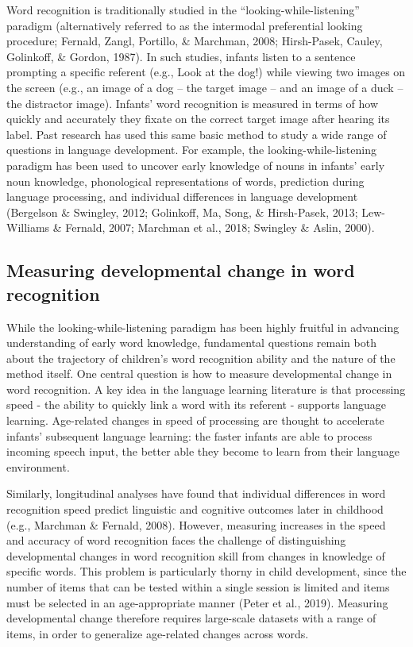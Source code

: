 \documentclass[
  english,
  man,floatsintext]{apa6}
\begin{document}
Word recognition is traditionally studied in the \enquote{looking-while-listening} paradigm (alternatively referred to as the intermodal preferential looking procedure; Fernald, Zangl, Portillo, \& Marchman, 2008; Hirsh-Pasek, Cauley, Golinkoff, \& Gordon, 1987).
In such studies, infants listen to a sentence prompting a specific referent (e.g., Look at the dog!) while viewing two images on the screen (e.g., an image of a dog -- the target image -- and an image of a duck -- the distractor image).
Infants' word recognition is measured in terms of how quickly and accurately they fixate on the correct target image after hearing its label.
Past research has used this same basic method to study a wide range of questions in language development.
For example, the looking-while-listening paradigm has been used to uncover early knowledge of nouns in infants' early noun knowledge, phonological representations of words, prediction during language processing, and individual differences in language development (Bergelson \& Swingley, 2012; Golinkoff, Ma, Song, \& Hirsh-Pasek, 2013; Lew-Williams \& Fernald, 2007; Marchman et al., 2018; Swingley \& Aslin, 2000).

\hypertarget{measuring-developmental-change-in-word-recognition}{%
\subsection{Measuring developmental change in word recognition}\label{measuring-developmental-change-in-word-recognition}}

While the looking-while-listening paradigm has been highly fruitful in advancing understanding of early word knowledge, fundamental questions remain both about the trajectory of children's word recognition ability and the nature of the method itself.
One central question is how to measure developmental change in word recognition.
A key idea in the language learning literature is that processing speed - the ability to quickly link a word with its referent - supports language learning.
Age-related changes in speed of processing are thought to accelerate infants' subsequent language learning: the faster infants are able to process incoming speech input, the better able they become to learn from their language environment.

Similarly, longitudinal analyses have found that individual differences in word recognition speed predict linguistic and cognitive outcomes later in childhood (e.g., Marchman \& Fernald, 2008).
However, measuring increases in the speed and accuracy of word recognition faces the challenge of distinguishing developmental changes in word recognition skill from changes in knowledge of specific words.
This problem is particularly thorny in child development, since the number of items that can be tested within a single session is limited and items must be selected in an age-appropriate manner (Peter et al., 2019).
Measuring developmental change therefore requires large-scale datasets with a range of items, in order to generalize age-related changes across words.
\end{document}

